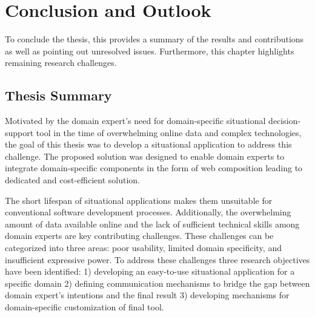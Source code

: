 \hypertarget{sec:conclusion}{%
\chapter{Conclusion and Outlook}\label{sec:conclusion}}

To conclude the thesis, this provides a summary of the results and contributions as well as pointing out unresolved issues. Furthermore, this chapter highlights remaining research challenges.

\vspace{-15pt}
\hypertarget{thesis-summary}{%
\section{Thesis Summary}\label{thesis-summary}}
\vspace{15pt}
Motivated by the domain expert’s need for domain-specific situational decision-support tool in the time of overwhelming online data and complex technologies, the goal of this thesis was to develop a situational application to address this challenge. The proposed solution was designed to enable domain experts to integrate domain-specific components in the form of web composition leading to dedicated and cost-efficient solution.

The short lifespan of situational applications makes them unsuitable for conventional software development processes. Additionally, the overwhelming amount of data available online and the lack of sufficient technical skills among domain experts are key contributing challenges. These challenges can be categorized into three areas: poor usability, limited domain specificity, and insufficient expressive power. To address these challenges three research objectives have been identified: 1) developing an easy-to-use situational application for a specific domain 2) defining communication mechanisms to bridge the gap between domain expert's intentions and the final result 3) developing mechanisms for domain-specific customization of final tool. 


